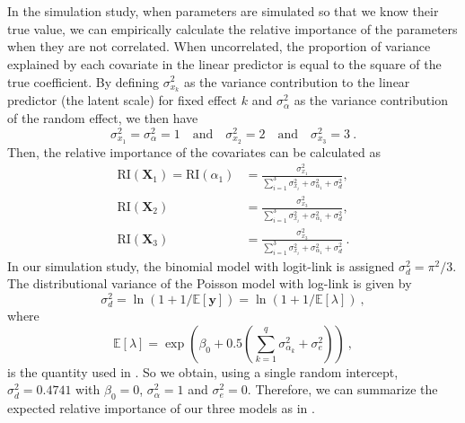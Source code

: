 \\
\\
In the simulation study, when parameters are simulated so that we know their true value, we can empirically calculate the relative importance of the parameters when they are not correlated. When uncorrelated, the proportion of variance explained by each covariate in the linear predictor is equal to the square of the true coefficient. By defining $\sigma_{x_k}^2$ as the variance contribution to the linear predictor (the latent scale) for fixed effect $k$ and $\sigma^2_{\alpha}$ as the variance contribution of the random effect, we then have 
\begin{equation}
    \sigma_{x_1}^2 = \sigma_{\alpha}^2  = 1 \quad \text{and} \quad \sigma_{x_2}^2 = 2 \quad \text{and} \quad \sigma_{x_3}^2 = 3 \ .
\end{equation}
Then, the relative importance of the covariates can be calculated as
\begin{equation}
    \begin{aligned}
        \text{RI}(\mathbf{X}_{1})  = \text{RI}(\alpha_1)  &= \frac{\sigma_{x_1}^2}{\sum_{i=1}^{3}\sigma_{x_i}^2 +\sigma_{\alpha_1}^2  + \sigma_d^2}, \\
        \text{RI}(\mathbf{X}_2) &= \frac{\sigma_{x_3}^2}{\sum_{i=1}^{3}\sigma_{x_i}^2 +\sigma_{\alpha_1}^2 +  \sigma_d^2}, \\
        \text{RI}(\mathbf{X}_3) &= \frac{\sigma_{x_3}^2}{\sum_{i=1}^{3}\sigma_{x_i}^2 +\sigma_{\alpha_1}^2 +  \sigma_d^2} \ .
    \end{aligned}
\end{equation}
In our simulation study, the binomial model with logit-link is assigned $\sigma^2_d=\pi^2/3$. The distributional variance of the Poisson model with log-link is given by 
\begin{equation}
    \sigma_d^2 = \ln (1 + 1/\mathbb{E}[\mathbf{y}]) = \ln (1 + 1/\mathbb{E}[\lambda]) \ ,
\end{equation}
where 
\begin{equation}
    \label{eq:lambda}
    \mathbb{E}[\lambda]=\exp\left(\beta_0 + 0.5 (\sum_{k=1}^q \sigma_{\alpha_k}^2 + \sigma^2_e)\right) \ ,
\end{equation}
is the quantity used in  \citep{nakagawa2017}. So we obtain, using a single random intercept, $\sigma_{d}^2=0.4741$ with $\beta_0=0$, $\sigma^2_{\alpha}=1$ and $\sigma^2_e=0$. Therefore, we can summarize the expected relative importance of our three models as in .
